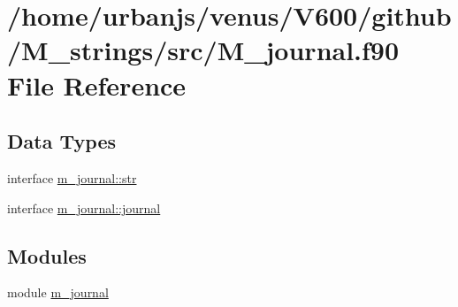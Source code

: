 \hypertarget{M__journal_8f90}{}\section{/home/urbanjs/venus/\+V600/github/\+M\+\_\+strings/src/\+M\+\_\+journal.f90 File Reference}
\label{M__journal_8f90}
\subsection*{Data Types}
\begin{DoxyCompactItemize}
\item 
interface \mbox{\hyperlink{interfacem__journal_1_1str}{m\+\_\+journal\+::str}}
\item 
interface \mbox{\hyperlink{interfacem__journal_1_1journal}{m\+\_\+journal\+::journal}}
\end{DoxyCompactItemize}
\subsection*{Modules}
\begin{DoxyCompactItemize}
\item 
module \mbox{\hyperlink{namespacem__journal}{m\+\_\+journal}}
\end{DoxyCompactItemize}
